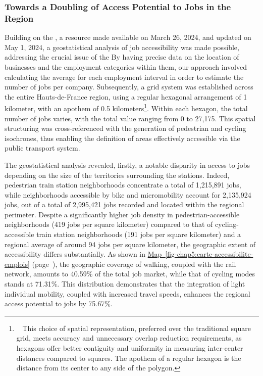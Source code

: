 \begin{refsegment}
\subsubsection*{Towards a Doubling of Access Potential to Jobs in the Region
    \label{chap5:potentiel-accessibilite-emplois}
}

Building on the \textcolor{blue}{\textcite{repertoire_sirene_des_entreprises_et_de_leurs_etablissements_base_2024}}, a resource made available on March 26, 2024, and updated on May 1, 2024, a geostatistical analysis of job accessibility was made possible, addressing the crucial issue of the  By having precise data on the location of businesses and the employment categories within them, our approach involved calculating the average for each employment interval in order to estimate the number of jobs per company. Subsequently, a grid system was established across the entire Hauts-de-France region, using a regular hexagonal arrangement of 1 kilometer, with an apothem of 0.5 kilometers\footnote{~
    This choice of spatial representation, preferred over the traditional square grid, meets accuracy and unnecessary overlap reduction requirements, as hexagons offer better contiguity and uniformity in measuring inter-center distances compared to squares. The apothem of a regular hexagon is the distance from its center to any side of the polygon.
}. Within each hexagon, the total number of jobs varies, with the total value ranging from 0 to 27,175. This spatial structuring was cross-referenced with the generation of pedestrian and cycling isochrones, thus enabling the definition of areas effectively accessible via the public transport system. %

The geostatistical analysis revealed, firstly, a notable disparity in access to jobs depending on the size of the territories surrounding the stations. Indeed, pedestrian train station neighborhoods concentrate a total of 1,215,891 jobs, while neighborhoods accessible by bike and micromobility account for 2,135,924 jobs, out of a total of 2,995,421 jobs recorded and located within the regional perimeter. Despite a significantly higher job density in pedestrian-accessible neighborhoods (419 jobs per square kilometer) compared to that of cycling-accessible train station neighborhoods (191 jobs per square kilometer) and a regional average of around 94 jobs per square kilometer, the geographic extent of accessibility differs substantially. As shown in \hyperref[fig-chap5:carte-accessibilite-emplois]{Map~\ref{fig-chap5:carte-accessibilite-emplois}} (page~\pageref{fig-chap5:carte-accessibilite-emplois}), the geographic coverage of walking, coupled with the rail network, amounts to 40.59\% of the total job market, while that of cycling modes stands at 71.31\%. This distribution demonstrates that the integration of light individual mobility, coupled with increased travel speeds, enhances the regional access potential to jobs by 75.67\%.%


\end{refsegment}

